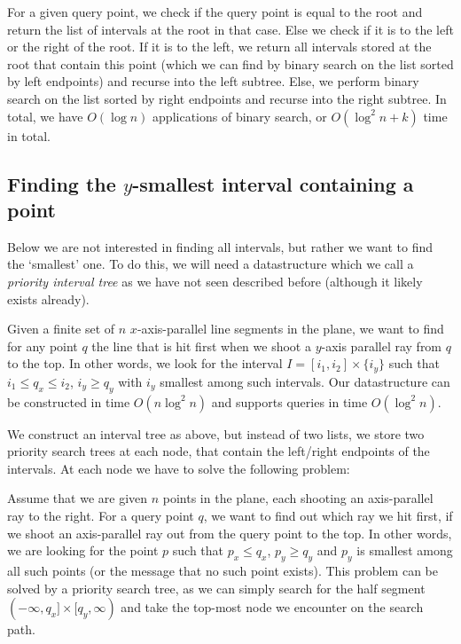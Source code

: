 \documentclass[11pt, a4paper, twocolumn]{article}
\begin{document}
For a given query point, we check if the query point is equal to the root and return the
list of intervals at the root in that case. Else we check if it is to the left or the right
of the root. If it is to the left, we return all intervals stored at the root that contain
this point (which we can find by binary search on the list sorted by left endpoints) and recurse
into the left subtree. Else, we perform binary search on the list sorted by right endpoints and
recurse into the right subtree. In total, we have $O(\log n)$ applications of binary search,
or $O(\log^2 n + k)$ time in total.

\subsection{Finding the $y$-smallest interval containing a point}

Below we are not interested in finding all intervals, but rather we want to
find the `smallest' one. To do this, we will need a datastructure
which we call a \textit{priority interval tree} as
we have not seen described before (although it likely exists already).

Given a finite set of $n$ $x$-axis-parallel line segments in the plane,
we want to find for any point $q$ the line that is hit first when
we shoot a $y$-axis parallel ray from $q$ to the top. In other words,
we look for the interval $I = [i_1, i_2] \times \{i_y\}$ such that $i_1 \leq q_x \leq i_2$, $i_y \geq q_y$
with $i_y$ smallest among such intervals. Our datastructure can be constructed in time $O(n \log^2 n)$
and supports queries in time $O(\log^2 n)$.

We construct an interval tree as above, but instead of two lists, we store
two priority search trees at each node, that contain the left/right endpoints
of the intervals. At each node we have to solve the following problem:

Assume that we are given $n$ points in the plane, each shooting an axis-parallel
ray to the right. For a query point $q$, we want to find out which ray we hit first,
if we shoot an axis-parallel ray out from the query point to the top.
In other words, we are looking for the point $p$ such that $p_x \leq q_x$, $p_y \geq q_y$
and $p_y$ is smallest among all such points (or the message that no such point exists).
This problem can be solved by a priority search tree, as we can simply
search for the half segment $(-\infty, q_x] \times [q_y, \infty)$ and take the top-most
node we encounter on the search path.
\end{document}
